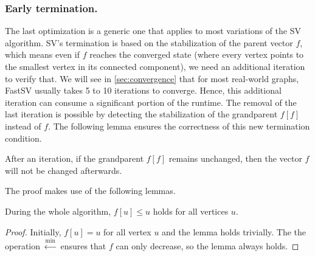 \documentclass{sokendai_thesis} %
\begin{document}
\subsubsection{Early termination.}
\label{sec:termination}

The last optimization is a generic one that applies to most variations of the SV algorithm.
SV's termination is based on the stabilization of the parent vector $f$, which means even if $f$ reaches the converged state (where every vertex points to the smallest vertex in its connected component), we need an additional iteration to verify that.
We will see in \autoref{sec:convergence} that for most real-world graphs, FastSV usually takes 5 to 10 iterations to converge.
Hence, this additional iteration can consume a significant portion of the runtime. %
The removal of the last iteration is possible by detecting the stabilization of the grandparent $f[f]$ instead of $f$.
The following lemma ensures the correctness of this new termination condition.
\begin{lemma}\label{thm1}
After an iteration, if the grandparent $f[f]$ remains unchanged, then the vector $f$ will not be changed afterwards.
\end{lemma}

The proof makes use of the following lemmas.

\begin{lemma}\label{lemma1}
During the whole algorithm, $f[u]\leq u$ holds for all vertices $u$.
\end{lemma}

\begin{proof}
Initially, $f[u]=u$ for all vertex $u$ and the lemma holds trivially.
The the operation $\xleftarrow{\min}$ ensures that $f$ can only decrease, so the lemma always holds.
\end{proof}

\end{document}
